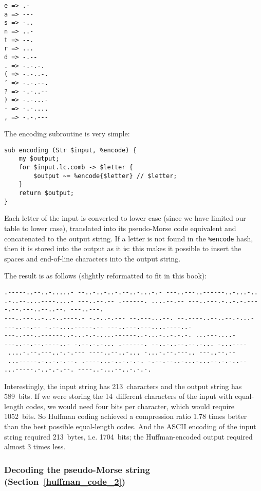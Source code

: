 \begin{verbatim}
e => .-
a => ---
s => -..
n => ..-
t => --.
r => ...
d => -.--
. => -.-.-.
( => -.-..-.
’ => -.-.--.
? => -.-..--
) => -.-...-
- => -.-....
, => -.-.---
\end{verbatim}

The encoding subroutine is very simple:

\begin{verbatim}
sub encoding (Str $input, %encode) {
    my $output;
    for $input.lc.comb -> $letter {
        $output ~= %encode{$letter} // $letter;
    }
    return $output;
}
\end{verbatim}

Each letter of the input is converted to lower case (since we have 
limited our table to lower case), translated into its pseudo-Morse 
code equivalent and concatenated to the output string. If a letter
is not found in the \verb'%encode' hash, then it is stored into 
the output as it is: this makes it possible to insert the spaces 
and end-of-line characters into the output string.

The result is as follows (slightly reformatted to fit in this book):
\begin{verbatim}
.-----..--..-.....- --..-..-..-.--..-...-.- ---..---..------..-...-..
.-..--....----....- ---..--.-- .------. ....--.-- ---..---.-..-.-.---
-.--.---..--..--. ---..---.
---..---..-..-..----.- -.-..-.--- --.---...--. --.----..--..--.-...- 
---..--.-- -.--....-----.-- ---..---.---....----..-
---..---..------..-...-.-.....------..-...-..-.-.-. ...---....-
---..--.--.----..- -.--.-.-... .------. --..-..--.--.-... -...----
 ....-.--.---..-.-.--- ----..--..-... -...-.--.---.. ---..--.-- 
 ...-----.-..-.-.--. .----...-..-.-.-. -.--.--..-...-...--.-.-..--
...-----.-..-.-.--. ----..-...--..-.-.-.
\end{verbatim}

Interestingly, the input string has 213~characters and the output 
string has 589~bits. If we were storing the 14~different characters of 
the input with equal-length codes, we would need four bits per 
character, which would require 1052~bits. So Huffman coding 
achieved a compression ratio 1.78 times better than the best possible 
equal-length codes. And the ASCII encoding of the input string 
required 213~bytes, i.e. 1704~bits; the Huffman-encoded output 
required almost 3 times less. 

\subsubsection{Decoding the pseudo-Morse string (Section~\ref{huffman_code_2})}

